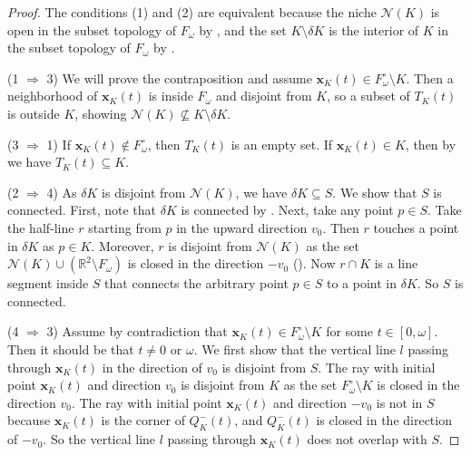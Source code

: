 \begin{proof}
The conditions (1) and (2) are equivalent because the niche \(\mathcal{N}(K)\) is open in the subset topology of \(F_\omega\) by , and the set \(K \setminus \delta K\) is the interior of \(K\) in the subset topology of \(F_\omega\) by .

(1 \(\Rightarrow\) 3) We will prove the contraposition and assume \(\mathbf{x}_K(t) \in F_\omega^\circ \setminus K\). Then a neighborhood of \(\mathbf{x}_K(t)\) is inside \(F_\omega\) and disjoint from \(K\), so a subset of \(T_K(t)\) is outside \(K\), showing \(\mathcal{N}(K) \not\subseteq K \setminus \delta K\).

(3 \(\Rightarrow\) 1) If \(\mathbf{x}_K(t) \not \in F_\omega^\circ\), then \(T_K(t)\) is an empty set. If \(\mathbf{x}_K(t) \in K\), then by  we have \(T_K(t) \subseteq K\).

(2 \(\Rightarrow\) 4) As \(\delta K\) is disjoint from \(\mathcal{N}(K)\), we have \(\delta K \subseteq S\). We show that \(S\) is connected. First, note that \(\delta K\) is connected by . Next, take any point \(p \in S\). Take the half-line \(r\) starting from \(p\) in the upward direction \(v_0\). Then \(r\) touches a point in \(\delta K\) as \(p \in K\). Moreover, \(r\) is disjoint from \(\mathcal{N}(K)\) as the set \(\mathcal{N}(K) \cup (\mathbb{R}^2 \setminus F_\omega)\) is closed in the direction \(-v_0\) (). Now \(r \cap K\) is a line segment inside \(S\) that connects the arbitrary point \(p \in S\) to a point in \(\delta K\). So \(S\) is connected.

(4 \(\Rightarrow\) 3) Assume by contradiction that \(\mathbf{x}_K(t) \in F_\omega^\circ \setminus K\) for some \(t \in [0, \omega]\). Then it should be that \(t \neq 0\) or \(\omega\). We first show that the vertical line \(l\) passing through \(\mathbf{x}_K(t)\) in the direction of \(v_0\) is disjoint from \(S\). The ray with initial point \(\mathbf{x}_K(t)\) and direction \(v_0\) is disjoint from \(K\) as the set \(F_\omega^\circ \setminus K\) is closed in the direction \(v_0\). The ray with initial point \(\mathbf{x}_K(t)\) and direction \(-v_0\) is not in \(S\) because \(\mathbf{x}_K(t)\) is the corner of \(Q_K^-(t)\), and \(Q_K^-(t)\) is closed in the direction of \(-v_0\). So the vertical line \(l\) passing through \(\mathbf{x}_K(t)\) does not overlap with \(S\).


\end{proof}
